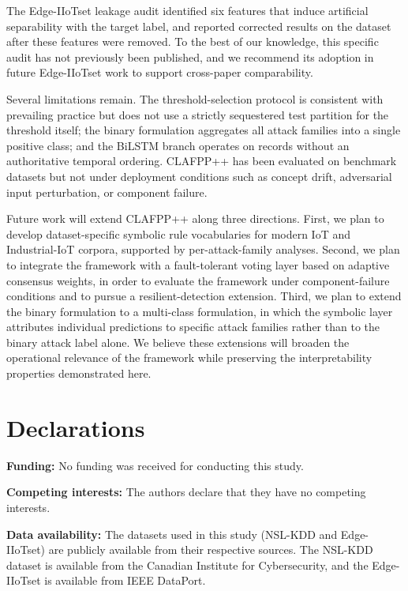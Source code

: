 \documentclass[pdflatex,sn-mathphys-num]{sn-jnl}
\theoremstyle{thmstyleone}
\theoremstyle{thmstyletwo}
\theoremstyle{thmstylethree}
\begin{document}
The Edge-IIoTset leakage audit identified six features that induce artificial separability with the target label, and reported corrected results on the dataset after these features were removed. To the best of our knowledge, this specific audit has not previously been published, and we recommend its adoption in future Edge-IIoTset work to support cross-paper comparability.

Several limitations remain. The threshold-selection protocol is consistent with prevailing practice but does not use a strictly sequestered test partition for the threshold itself; the binary formulation aggregates all attack families into a single positive class; and the BiLSTM branch operates on records without an authoritative temporal ordering. CLAFPP++ has been evaluated on benchmark datasets but not under deployment conditions such as concept drift, adversarial input perturbation, or component failure.

Future work will extend CLAFPP++ along three directions. First, we plan to develop dataset-specific symbolic rule vocabularies for modern IoT and Industrial-IoT corpora, supported by per-attack-family analyses. Second, we plan to integrate the framework with a fault-tolerant voting layer based on adaptive consensus weights, in order to evaluate the framework under component-failure conditions and to pursue a resilient-detection extension. Third, we plan to extend the binary formulation to a multi-class formulation, in which the symbolic layer attributes individual predictions to specific attack families rather than to the binary attack label alone. We believe these extensions will broaden the operational relevance of the framework while preserving the interpretability properties demonstrated here.

\backmatter

\section*{Declarations}

\textbf{Funding:} No funding was received for conducting this study.

\textbf{Competing interests:} The authors declare that they have no competing interests.

\textbf{Data availability:} The datasets used in this study (NSL-KDD and Edge-IIoTset) are publicly available from their respective sources. The NSL-KDD dataset is available from the Canadian Institute for Cybersecurity, and the Edge-IIoTset is available from IEEE DataPort.
\end{document}
